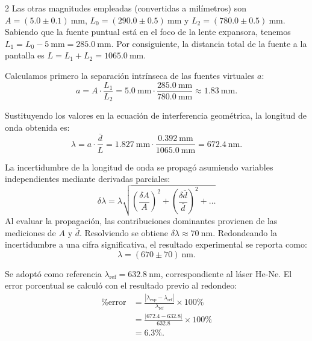\documentclass{article}
\begin{document}
\begin{multicols*}{2}
Las otras magnitudes empleadas (convertidas a milímetros) son $A = (5.0 \pm 0.1)\ \mathrm{mm}$, $L_0 = (290.0 \pm 0.5)\ \mathrm{mm}$ y $L_2 = (780.0 \pm 0.5)\ \mathrm{mm}$. 
Sabiendo que la fuente puntual está en el foco de la lente expansora, tenemos $L_1 = L_0 - 5\ \mathrm{mm} = 285.0\ \mathrm{mm}$. Por consiguiente, la distancia total de la fuente a la pantalla es $L = L_1 + L_2 = 1065.0\ \mathrm{mm}$.

Calculamos primero la separación intrínseca de las fuentes virtuales $a$:
\begin{equation}
a = A \cdot \frac{L_1}{L_2} = 5.0\ \mathrm{mm} \cdot \frac{285.0\ \mathrm{mm}}{780.0\ \mathrm{mm}} \approx 1.83\ \mathrm{mm}.
\end{equation}

Sustituyendo los valores en la ecuación de interferencia geométrica, la longitud de onda obtenida es:
\begin{equation}
\lambda = a \cdot \frac{\bar d}{L} = 1.827\ \mathrm{mm} \cdot \frac{0.392\ \mathrm{mm}}{1065.0\ \mathrm{mm}} = 672.4\ \mathrm{nm}.
\end{equation}

La incertidumbre de la longitud de onda se propagó asumiendo variables independientes mediante derivadas parciales:
\begin{equation}
\delta\lambda=\lambda\sqrt{\left(\frac{\delta A}{A}\right)^2+\left(\frac{\delta\bar d}{\bar d}\right)^2+\dots}
\end{equation}
Al evaluar la propagación, las contribuciones dominantes provienen de las mediciones de $A$ y $\bar d$. Resolviendo se obtiene $\delta\lambda \approx 70\ \mathrm{nm}$. Redondeando la incertidumbre a una cifra significativa, el resultado experimental se reporta como:
\begin{equation}
\boxed{\lambda=(670\pm70)\ \mathrm{nm}.}
\end{equation}

Se adoptó como referencia $\lambda_{\mathrm{ref}}=632.8\ \mathrm{nm}$, correspondiente al láser He-Ne. El error porcentual se calculó con el resultado previo al redondeo:
\begin{equation}
\begin{split}
\%\mathrm{error}
&=\frac{|\lambda_{\mathrm{exp}}-\lambda_{\mathrm{ref}}|}{\lambda_{\mathrm{ref}}}\times100\%\\
&=\frac{|672.4-632.8|}{632.8}\times100\%\\
&=6.3\%.
\end{split}
\end{equation}


\end{multicols*}
\end{document}
